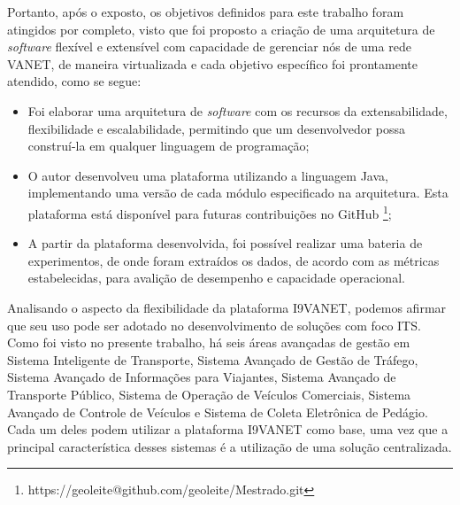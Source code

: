 \documentclass[
	12pt,				%
	oneside,			%
	a4paper,			%
	english,			%
	brazil				%
	]{abntex2ppgsi}
\begin{document}
Portanto, após o exposto, os objetivos definidos para este trabalho foram atingidos por completo, visto que foi proposto a criação de uma arquitetura de \textit{software} flexível e extensível com capacidade de gerenciar nós de uma rede VANET, de maneira virtualizada e cada objetivo específico foi prontamente atendido, como se segue: 

\begin{itemize}
	\item{Foi elaborar uma arquitetura de \textit{software} com os recursos da extensabilidade, flexibilidade e escalabilidade, permitindo que um desenvolvedor possa construí-la em qualquer linguagem de programação;}	
	\item{O autor desenvolveu uma plataforma utilizando a linguagem Java, implementando uma versão de cada módulo especificado na arquitetura. Esta plataforma está disponível para futuras contribuições no GitHub \footnote{https://geoleite@github.com/geoleite/Mestrado.git};}	
	\item{A partir da plataforma desenvolvida, foi possível realizar uma bateria de experimentos, de onde foram extraídos os dados, de acordo com as métricas estabelecidas, para avalição de desempenho e capacidade operacional.}	
\end{itemize} 


Analisando o aspecto da flexibilidade da plataforma I9VANET, podemos afirmar que seu uso pode ser adotado no desenvolvimento de soluções com foco ITS. Como foi visto no presente trabalho, há seis áreas avançadas de gestão em Sistema Inteligente de Transporte, Sistema Avançado de Gestão de Tráfego, Sistema Avançado de Informações para Viajantes, Sistema Avançado de Transporte Público, Sistema de Operação de Veículos Comerciais, Sistema Avançado de Controle de Veículos e Sistema de Coleta Eletrônica de Pedágio. Cada um deles podem utilizar a plataforma I9VANET como base, uma vez que a principal característica desses sistemas é a utilização de uma solução centralizada. 



\end{document}
